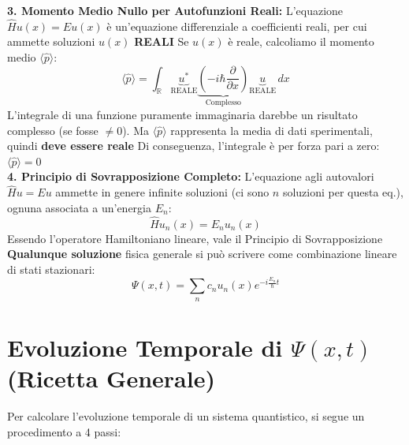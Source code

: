\documentclass[11pt, a4paper]{article}
\begin{document}
\noindent
\textbf{3. Momento Medio Nullo per Autofunzioni Reali:} %
L'equazione $\hat{H}u(x) = Eu(x)$ è un'equazione differenziale a coefficienti reali, per cui ammette soluzioni $u(x)$ \textbf{REALI} %
Se $u(x)$ è reale, calcoliamo il momento medio $\langle \hat{p} \rangle$: %
\begin{equation*}
    \langle \hat{p} \rangle = \int_{\mathbb{R}} \underbrace{u^*}_{\text{REALE}} \underbrace{\left(-i\hbar \frac{\partial}{\partial x}\right)}_{\text{Complesso}} \underbrace{u}_{\text{REALE}} \, dx %
\end{equation*}
L'integrale di una funzione puramente immaginaria darebbe un risultato complesso (se fosse $\neq 0$). Ma $\langle \hat{p} \rangle$ rappresenta la media di dati sperimentali, quindi \textbf{deve essere reale} %
Di conseguenza, l'integrale è per forza pari a zero: $\langle \hat{p} \rangle = 0$ \\

\noindent
\textbf{4. Principio di Sovrapposizione Completo:} %
L'equazione agli autovalori $\hat{H}u = Eu$ ammette in genere infinite soluzioni (ci sono $n$ soluzioni per questa eq.), ognuna associata a un'energia $E_n$: %
\begin{equation*}
    \hat{H} u_n(x) = E_n u_n(x) %
\end{equation*}
Essendo l'operatore Hamiltoniano lineare, vale il Principio di Sovrapposizione %
\textbf{Qualunque soluzione} fisica generale si può scrivere come combinazione lineare di stati stazionari: %
\begin{equation}
    \boxed{ \Psi(x,t) = \sum_n c_n u_n(x) e^{-i\frac{E_n}{\hbar}t} } %
\end{equation}

\section{Evoluzione Temporale di $\Psi(x,t)$ (Ricetta Generale)} %

Per calcolare l'evoluzione temporale di un sistema quantistico, si segue un procedimento a 4 passi: %
\end{document}

